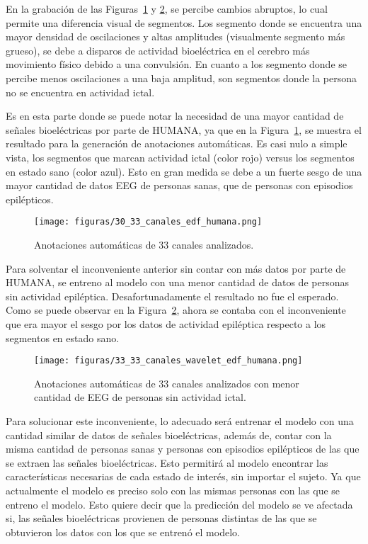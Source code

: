En la grabación de las Figuras~\ref{fig: 33_chn_grafica} y \ref{fig: 33_chn_grafica_menos}, se percibe cambios abruptos, lo cual permite una diferencia visual de segmentos. Los segmento donde se encuentra una mayor densidad de oscilaciones y altas amplitudes (visualmente segmento más grueso), se debe a disparos de actividad bioeléctrica en el cerebro más movimiento físico debido a una convulsión. En cuanto a los segmento donde se percibe menos oscilaciones a una baja amplitud, son segmentos donde la persona no se encuentra en actividad ictal.  

Es en esta parte donde se puede notar la necesidad de una mayor cantidad de señales bioeléctricas por parte de HUMANA, ya que en la Figura~\ref{fig: 33_chn_grafica}, se muestra el resultado para la generación de anotaciones automáticas. Es casi nulo a simple vista, los segmentos que marcan actividad ictal (color rojo) versus los segmentos en estado sano (color azul). Esto en gran medida se debe a un fuerte sesgo de una mayor cantidad de datos EEG de personas sanas, que de personas con episodios epilépticos. 

\begin{figure}[H]
    \centering
    \texttt{[image: figuras/30\_33\_canales\_edf\_humana.png]}
    \caption{Anotaciones automáticas de 33 canales analizados.}
    \label{fig: 33_chn_grafica}
\end{figure}

Para solventar el inconveniente anterior sin contar con más datos por parte de HUMANA, se entreno al modelo con una menor cantidad de datos de personas sin actividad epiléptica. Desafortunadamente el resultado no fue el esperado. Como se puede observar en la Figura~\ref{fig: 33_chn_grafica_menos}, ahora se contaba con el inconveniente que era mayor el sesgo por los datos de actividad epiléptica respecto a los segmentos en estado sano.

\begin{figure}[H]
    \centering
    \texttt{[image: figuras/33\_33\_canales\_wavelet\_edf\_humana.png]}
    \caption{Anotaciones automáticas de 33 canales analizados con menor cantidad de EEG de personas sin actividad ictal.}
    \label{fig: 33_chn_grafica_menos}
\end{figure}

Para solucionar este inconveniente, lo adecuado será entrenar el modelo con una cantidad similar de datos de señales bioeléctricas, además de, contar con la misma cantidad de personas sanas y personas con episodios epilépticos de las que se extraen las señales bioeléctricas. Esto permitirá al modelo encontrar las características necesarias de cada estado de interés, sin importar el sujeto. Ya que actualmente el modelo es preciso solo con las mismas personas con las que se entreno el modelo. Esto quiere decir que la predicción del modelo se ve afectada si, las señales bioeléctricas provienen de personas distintas de las que se obtuvieron los datos con los que se entrenó el modelo. 

